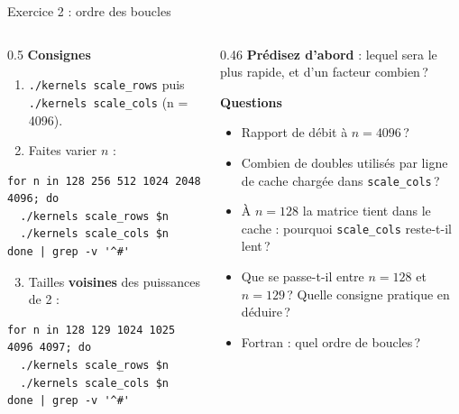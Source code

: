 \documentclass[8pt,aspectratio=169]{beamer}
\begin{document}
\begin{frame}[fragile]{Exercice 2 : ordre des boucles}
\begin{columns}[T]
\begin{column}{0.5\textwidth}
\textbf{Consignes}
\begin{enumerate}
\item \texttt{./kernels scale\_rows} puis \texttt{./kernels scale\_cols} (n = 4096).
\item Faites varier $n$ :
\end{enumerate}
\begin{verbatim}
for n in 128 256 512 1024 2048 4096; do
  ./kernels scale_rows $n
  ./kernels scale_cols $n
done | grep -v '^#'
\end{verbatim}
\begin{enumerate}\setcounter{enumi}{2}
\item Tailles \textbf{voisines} des puissances de 2 :
\end{enumerate}
\begin{verbatim}
for n in 128 129 1024 1025 4096 4097; do
  ./kernels scale_rows $n
  ./kernels scale_cols $n
done | grep -v '^#'
\end{verbatim}
\end{column}
\begin{column}{0.46\textwidth}
\textbf{Prédisez d'abord} : lequel sera le plus rapide, et d'un facteur combien\,?

\medskip
\textbf{Questions}
\begin{itemize}
\item Rapport de débit à $n=4096$\,?
\item Combien de doubles utilisés par ligne de cache chargée dans \texttt{scale\_cols}\,?
\item À $n=128$ la matrice tient dans le cache : pourquoi \texttt{scale\_cols} reste-t-il lent\,?
\item Que se passe-t-il entre $n=128$ et $n=129$\,? Quelle consigne pratique en déduire\,?
\item Fortran : quel ordre de boucles\,?
\end{itemize}
\end{column}
\end{columns}
\end{frame}
\end{document}
